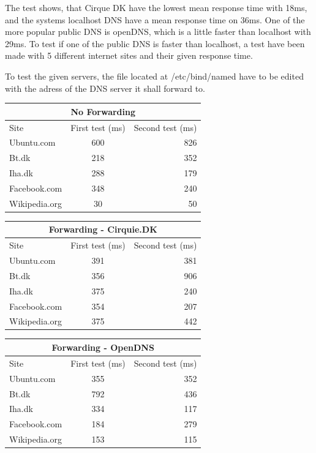 \documentclass[Preamble]{subfiles}
\begin{document}
The test shows, that Cirque DK have the lowest mean response time with 18ms, and the systems localhost DNS have a mean response time on 36ms. One of the more popular public DNS is openDNS, which is a little faster than localhost with 29ms. To test if one of the public DNS is faster than localhost, a test have been made with 5 different internet sites and their given response time. 

To test the given servers, the file located at /etc/bind/named have to be edited with the adress of the DNS server it shall forward to. 


\begin{center}
  \begin{tabular}{ l | c  | r}
    \multicolumn{3}{c}{No Forwarding}  \\
	\hline Site & First test (ms) & Second test (ms) \\     
    \hline
    Ubuntu.com & 600 & 826  \\ \hline
    Bt.dk & 218 & 352  \\ \hline
	Iha.dk & 288 & 179 \\ \hline
	Facebook.com & 348 &	240 \\ \hline
	Wikipedia.org & 30 &	50 \\ \hline
  \end{tabular}
\end{center}

\begin{center}
  \begin{tabular}{ l | c  | r}
    \multicolumn{3}{c}{Forwarding - Cirquie.DK}  \\
	\hline Site & First test (ms) & Second test (ms) \\     
    \hline
    Ubuntu.com & 391 & 381  \\ \hline
    Bt.dk & 356 & 906  \\ \hline
	Iha.dk & 375 & 240 \\ \hline
	Facebook.com & 354 &	207 \\ \hline
	Wikipedia.org & 375 & 442 \\ \hline
  \end{tabular}
\end{center}

\begin{center}
  \begin{tabular}{ l | c  | r}
    \multicolumn{3}{c}{Forwarding - OpenDNS}  \\
	\hline Site & First test (ms) & Second test (ms) \\     
    \hline
    Ubuntu.com & 355 & 352  \\ \hline
    Bt.dk & 792 & 436  \\ \hline
	Iha.dk & 334 & 117 \\ \hline
	Facebook.com & 184 & 279 \\ \hline
	Wikipedia.org & 153 & 115 \\ \hline
  \end{tabular}
\end{center}
\end{document}
